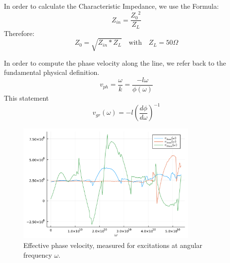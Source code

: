 \documentclass{article}
\begin{document}
In order to calculate the Characteristic Impedance, we use the Formula:
\[Z_{in} =  \frac{{Z_0}^2}{Z_L}\]
Therefore:
\begin{equation}
    Z_0 = \sqrt{Z_{in}*Z_L} \quad \text{with} \quad Z_L = 50 \Omega
\end{equation}






In order to compute the phase velocity along the line, we refer back to the fundamental physical definition.
\begin{equation}
    v_{ph} = \frac{\omega}{k} = \frac{-l \omega}{\phi(\omega)}
\end{equation}
This statement 
\begin{equation}
    v_{gr}(\omega) = -l \left( \frac{d\phi}{d\omega} \right)^{-1}
\end{equation}




\begin{figure}[H]
  \includegraphics[width=0.8\textwidth]{figures/build/phase_vel.pdf}
  \caption{Effective phase velocity, measured for excitations at angular frequency $\omega$.}
\end{figure}
\end{document}
